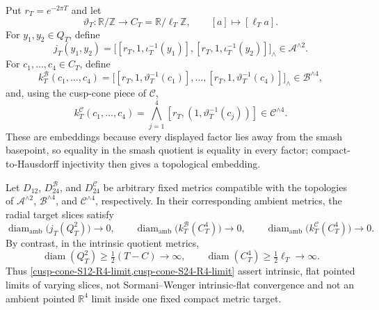 \begin{definition}
\label{cusp-cone-target-slice-embeddings}
Put \(r_T=e^{-2\pi T}\) and let
\[
 \vartheta_T:\mathbb R/\mathbb Z\longrightarrow
 C_T=\mathbb R/\ell_T\mathbb Z,\qquad [a]\longmapsto[\ell_Ta].
\]
For \(y_1,y_2\in Q_T\), define
\[
 j_T(y_1,y_2)=
 \bigl[[r_T,1,\iota_T^{-1}(y_1)],
       [r_T,1,\iota_T^{-1}(y_2)]\bigr]_{\wedge}
 \in\mathcal A^{\wedge2}.
\]
For \(c_1,\ldots,c_4\in C_T\), define
\[
 k_T^{\mathcal B}(c_1,\ldots,c_4)=
 \bigl[[r_T,1,\vartheta_T^{-1}(c_1)],\ldots,
       [r_T,1,\vartheta_T^{-1}(c_4)]\bigr]_{\wedge}
 \in\mathcal B^{\wedge4},
\]
and, using the cusp-cone piece of \(\mathcal C\),
\[
 k_T^{\mathcal C}(c_1,\ldots,c_4)=
 \bigwedge_{j=1}^4[r_T,(1,\vartheta_T^{-1}(c_j))]
 \in\mathcal C^{\wedge4}.
\]
These are embeddings because every displayed factor lies away from the smash
basepoint, so equality in the smash quotient is equality in every factor;
compact-to-Hausdorff injectivity then gives a topological embedding.
\end{definition}

\begin{proposition}
\label{cusp-cone-metric-scope}
Let \(D_{12}\), \(D_{24}^{\mathcal B}\), and
\(D_{24}^{\mathcal C}\) be arbitrary fixed metrics compatible with the
topologies of \(\mathcal A^{\wedge2}\), \(\mathcal B^{\wedge4}\), and
\(\mathcal C^{\wedge4}\), respectively.  In their corresponding ambient
metrics, the radial target
slices satisfy
\begin{equation}
 \operatorname{diam}_{\mathrm{amb}}
 \bigl(j_T(Q_T^2)\bigr)\longrightarrow0,\qquad
 \operatorname{diam}_{\mathrm{amb}}
 \bigl(k_T^{\mathcal B}(C_T^4)\bigr)\longrightarrow0,\qquad
 \operatorname{diam}_{\mathrm{amb}}
 \bigl(k_T^{\mathcal C}(C_T^4)\bigr)\longrightarrow0.
 \label{cusp-cone-ambient-collapse}
\end{equation}
By contrast, in the intrinsic quotient metrics,
\begin{equation}
 \operatorname{diam}(Q_T^2)\geq\tfrac12(T-C)\longrightarrow\infty,\qquad
 \operatorname{diam}(C_T^4)\geq\tfrac12\ell_T\longrightarrow\infty.
 \label{cusp-cone-intrinsic-expansion}
\end{equation}
Thus \cref{cusp-cone-S12-R4-limit,cusp-cone-S24-R4-limit} assert
intrinsic, flat pointed limits of varying slices, not Sormani--Wenger
intrinsic-flat convergence and not an ambient pointed \(\mathbb R^4\) limit
inside one fixed compact metric target.
\end{proposition}

